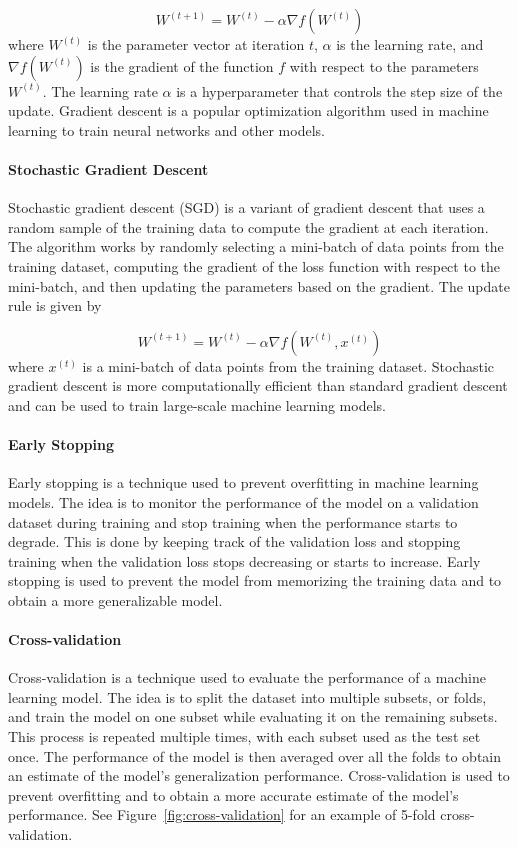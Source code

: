 $$
    W^{(t+1)} = W^{(t)} - \alpha \nabla f(W^{(t)})
$$
where $W^{(t)}$ is the parameter vector at iteration $t$, $\alpha$ is the learning rate, and $\nabla f(W^{(t)})$ is the gradient of the function $f$ with respect to the parameters $W^{(t)}$. The learning rate $\alpha$ is a hyperparameter that controls the step size of the update. Gradient descent is a popular optimization algorithm used in machine learning to train neural networks and other models.

\paragraph{Stochastic Gradient Descent}
Stochastic gradient descent (SGD) is a variant of gradient descent that uses a random sample of the training data to compute the gradient at each iteration. The algorithm works by randomly selecting a mini-batch of data points from the training dataset, computing the gradient of the loss function with respect to the mini-batch, and then updating the parameters based on the gradient. The update rule is given by

$$
    W^{(t+1)} = W^{(t)} - \alpha \nabla f(W^{(t)}, x^{(t)})
$$
where $x^{(t)}$ is a mini-batch of data points from the training dataset. Stochastic gradient descent is more computationally efficient than standard gradient descent and can be used to train large-scale machine learning models.

\paragraph{Early Stopping}
Early stopping is a technique used to prevent overfitting in machine learning models. The idea is to monitor the performance of the model on a validation dataset during training and stop training when the performance starts to degrade. This is done by keeping track of the validation loss and stopping training when the validation loss stops decreasing or starts to increase. Early stopping is used to prevent the model from memorizing the training data and to obtain a more generalizable model. 

\paragraph{Cross-validation}
Cross-validation is a technique used to evaluate the performance of a machine learning model. The idea is to split the dataset into multiple subsets, or folds, and train the model on one subset while evaluating it on the remaining subsets. This process is repeated multiple times, with each subset used as the test set once. The performance of the model is then averaged over all the folds to obtain an estimate of the model's generalization performance. Cross-validation is used to prevent overfitting and to obtain a more accurate estimate of the model's performance. See Figure~\ref{fig:cross-validation} for an example of 5-fold cross-validation.


